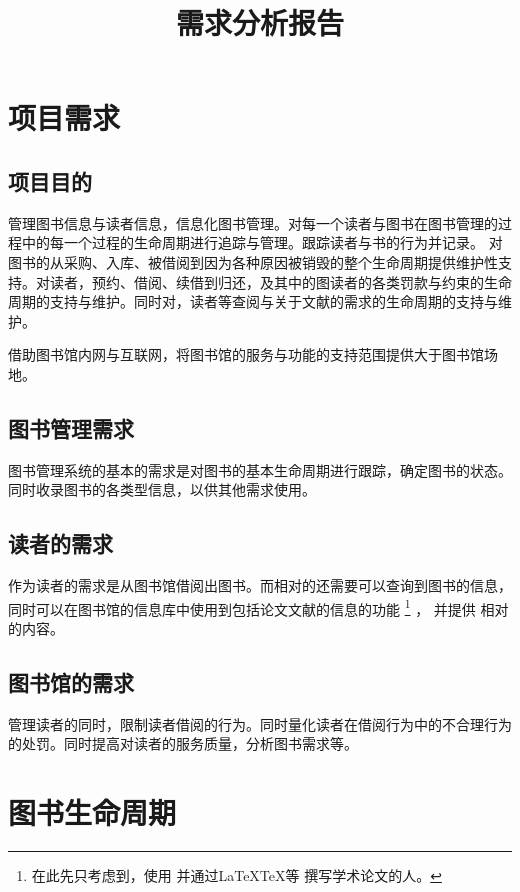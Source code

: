 \documentclass[UTF8]{report}
\title{需求分析报告}
\begin{document}
    \maketitle
    
    
    \tableofcontents
    \chapter[概述]{项目需求}
    \section{项目目的}
    管理图书信息与读者信息，信息化图书管理。对每一个读者与图书在图书管理的过程中的每一个过程的生命周期进行追踪与管理。跟踪读者与书的行为并记录。
    对图书的从采购、入库、被借阅到因为各种原因被销毁的整个生命周期提供维护性支持。对读者，预约、借阅、续借到归还，及其中的图读者的各类罚款与约束的生命周期的支持与维护。同时对，读者等查阅与关于文献的需求的生命周期的支持与维护。

    借助图书馆内网与互联网，将图书馆的服务与功能的支持范围提供大于图书馆场地。
    \section{图书管理需求}
    图书管理系统的基本的需求是对图书的基本生命周期进行跟踪，确定图书的状态。同时收录图书的各类型信息，以供其他需求使用。
    \section{读者的需求}
    作为读者的需求是从图书馆借阅出图书。而相对的还需要可以查询到图书的信息，同时可以在图书馆的信息库中使用到包括论文文献的信息的功能
    \footnote{在此先只考虑到，使用 \BibTeX 并通过\LaTeX \space \TeX 等  撰写学术论文的人。} ， 并提供 \BibTeX 相对的内容。
    \section{图书馆的需求}
    管理读者的同时，限制读者借阅的行为。同时量化读者在借阅行为中的不合理行为的处罚。同时提高对读者的服务质量，分析图书需求等。
    \chapter{图书生命周期}
\end{document}
